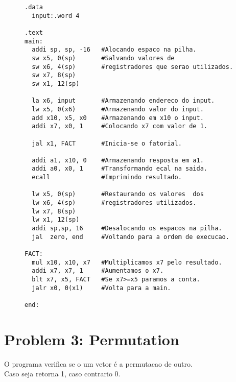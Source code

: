 \documentclass[a4paper,11pt]{article}
\theoremstyle{mytheor}
\begin{document}
\begin{figure}[htb]
\begin{small}
\begin{lstlisting}[language=riskV]
.data
  input:.word 4
 
.text
main:
  addi sp, sp, -16	 #Alocando espaco na pilha.
  sw x5, 0(sp)     	 #Salvando valores de 
  sw x6, 4(sp)		 #registradores que serao utilizados.
  sw x7, 8(sp)
  sw x1, 12(sp)
  
  la x6, input		 #Armazenando endereco do input.
  lw x5, 0(x6)		 #Armazenando valor do input.
  add x10, x5, x0	 #Armazenando em x10 o input.
  addi x7, x0, 1   	 #Colocando x7 com valor de 1.
  
  jal x1, FACT		 #Inicia-se o fatorial.
  
  addi a1, x10, 0	 #Armazenando resposta em a1.
  addi a0, x0, 1 	 #Transformando ecal na saida.
  ecall				 #Imprimindo resultado.
  
  lw x5, 0(sp)   	 #Restaurando os valores  dos
  lw x6, 4(sp)		 #registradores utilizados.
  lw x7, 8(sp)
  lw x1, 12(sp)
  addi sp,sp, 16  	 #Desalocando os espacos na pilha.
  jal  zero, end	 #Voltando para a ordem de execucao.
  
FACT:
  mul x10, x10, x7 	 #Multiplicamos x7 pelo resultado.
  addi x7, x7, 1	 #Aumentamos o x7.
  blt x7, x5, FACT 	 #Se x7>=x5 paramos a conta.
  jalr x0, 0(x1)	 #Volta para a main.
  
end:
\end{lstlisting}
\end{small}
\end{figure} 


\pagebreak
\section*{Problem 3: Permutation}
O programa verifica se o um vetor é a permutacao de outro.\\
Caso seja retorna 1, caso contrario 0.
\end{document}
